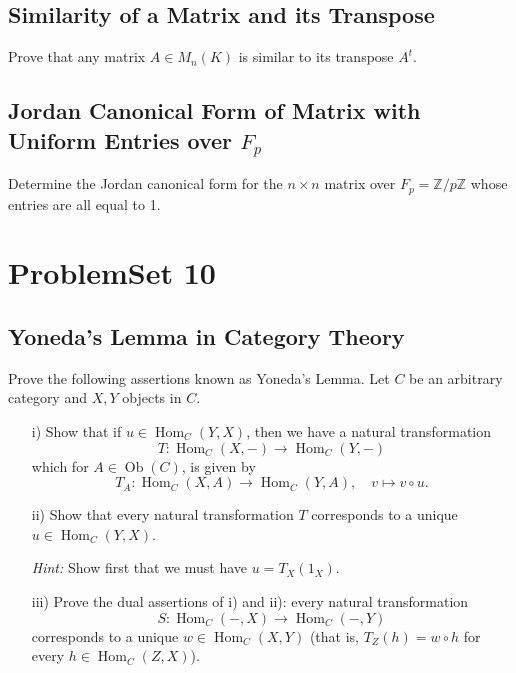 \documentclass[lang=cn,11pt]{template}
\begin{document}
\section{Similarity of a Matrix and its Transpose}
Prove that any matrix \( A \in M_n(K) \) is similar to its transpose \( A^t \).

\section{Jordan Canonical Form of Matrix with Uniform Entries over \( F_p \)}
Determine the Jordan canonical form for the \( n \times n \) matrix over \( F_p = \mathbb{Z}/p\mathbb{Z} \) whose entries are all equal to 1.











\chapter{ProblemSet 10}

\section{Yoneda's Lemma in Category Theory}
Prove the following assertions known as Yoneda’s Lemma. Let \( C \) be an arbitrary category and \( X, Y \) objects in \( C \).
\begin{itemize}
    \item[i)] Show that if \( u \in \operatorname{Hom}_C(Y, X) \), then we have a natural transformation
    \[
    T : \operatorname{Hom}_C(X, -) \rightarrow \operatorname{Hom}_C(Y, -)
    \]
    which for \( A \in \operatorname{Ob}(C) \), is given by
    \[
    T_A : \operatorname{Hom}_C(X, A) \rightarrow \operatorname{Hom}_C(Y, A), \quad v \mapsto v \circ u.
    \]
    \item[ii)] Show that every natural transformation \( T \) corresponds to a unique \( u \in \operatorname{Hom}_C(Y, X) \).
    
    \textit{Hint:} Show first that we must have \( u = T_X(1_X) \).
    
    \item[iii)] Prove the dual assertions of i) and ii): every natural transformation
    \[
    S : \operatorname{Hom}_C(-, X) \rightarrow \operatorname{Hom}_C(-, Y)
    \]
    corresponds to a unique \( w \in \operatorname{Hom}_C(X, Y) \) (that is, \( T_Z(h) = w \circ h \) for every \( h \in \operatorname{Hom}_C(Z, X) \)).
\end{itemize}
\end{document}
